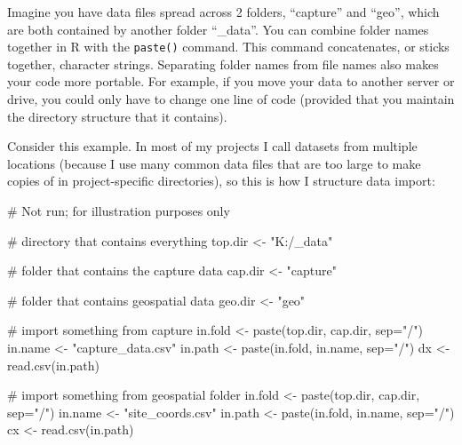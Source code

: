 \documentclass[
  13,
  letterpaper,
]{report}
\newenvironment{Shaded}{\begin{snugshade}}{\end{snugshade}}
\newcommand{\AttributeTok}[1]{\textcolor[rgb]{0.40,0.45,0.13}{#1}}
\newcommand{\CommentTok}[1]{\textcolor[rgb]{0.37,0.37,0.37}{#1}}
\newcommand{\FunctionTok}[1]{\textcolor[rgb]{0.28,0.35,0.67}{#1}}
\newcommand{\NormalTok}[1]{\textcolor[rgb]{0.00,0.23,0.31}{#1}}
\newcommand{\OtherTok}[1]{\textcolor[rgb]{0.00,0.23,0.31}{#1}}
\newcommand{\StringTok}[1]{\textcolor[rgb]{0.13,0.47,0.30}{#1}}
\begin{document}
Imagine you have data files spread across 2 folders, ``capture'' and
``geo'', which are both contained by another folder ``\_data''. You can
combine folder names together in R with the \texttt{paste()} command.
This command concatenates, or sticks together, character strings.
Separating folder names from file names also makes your code more
portable. For example, if you move your data to another server or drive,
you could only have to change one line of code (provided that you
maintain the directory structure that it contains).

Consider this example. In most of my projects I call datasets from
multiple locations (because I use many common data files that are too
large to make copies of in project-specific directories), so this is how
I structure data import:

\begin{Shaded}
\begin{Highlighting}[]
\CommentTok{\# Not run; for illustration purposes only}

\CommentTok{\# directory that contains everything}
\NormalTok{top.dir }\OtherTok{\textless{}{-}} \StringTok{"K:/\_data"}

\CommentTok{\# folder that contains the capture data}
\NormalTok{cap.dir }\OtherTok{\textless{}{-}} \StringTok{"capture"}

\CommentTok{\# folder that contains geospatial data}
\NormalTok{geo.dir }\OtherTok{\textless{}{-}} \StringTok{"geo"}

\CommentTok{\# import something from capture}
\NormalTok{in.fold }\OtherTok{\textless{}{-}} \FunctionTok{paste}\NormalTok{(top.dir, cap.dir, }\AttributeTok{sep=}\StringTok{"/"}\NormalTok{)}
\NormalTok{in.name }\OtherTok{\textless{}{-}} \StringTok{"capture\_data.csv"}
\NormalTok{in.path }\OtherTok{\textless{}{-}} \FunctionTok{paste}\NormalTok{(in.fold, in.name, }\AttributeTok{sep=}\StringTok{"/"}\NormalTok{)}
\NormalTok{dx }\OtherTok{\textless{}{-}} \FunctionTok{read.csv}\NormalTok{(in.path)}

\CommentTok{\# import something from geospatial folder}
\NormalTok{in.fold }\OtherTok{\textless{}{-}} \FunctionTok{paste}\NormalTok{(top.dir, cap.dir, }\AttributeTok{sep=}\StringTok{"/"}\NormalTok{)}
\NormalTok{in.name }\OtherTok{\textless{}{-}} \StringTok{"site\_coords.csv"}
\NormalTok{in.path }\OtherTok{\textless{}{-}} \FunctionTok{paste}\NormalTok{(in.fold, in.name, }\AttributeTok{sep=}\StringTok{"/"}\NormalTok{)}
\NormalTok{cx }\OtherTok{\textless{}{-}} \FunctionTok{read.csv}\NormalTok{(in.path)}
\end{Highlighting}
\end{Shaded}
\end{document}
